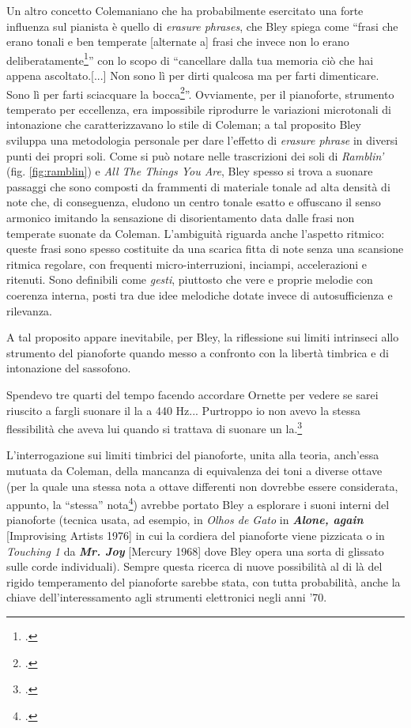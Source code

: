 Un altro concetto Colemaniano che ha probabilmente esercitato una forte influenza sul pianista è quello di \textit{erasure phrases}, che Bley spiega come ``frasi che erano tonali e ben temperate [alternate a] frasi che invece non lo erano deliberatamente\footcite[67]{stopping}'' con lo scopo di ``cancellare dalla tua memoria ciò che hai appena ascoltato.[...] Non sono lì per dirti qualcosa ma per farti dimenticare. Sono lì per farti sciacquare la bocca\footcite[32]{meehan}''. Ovviamente, per il pianoforte, strumento temperato per eccellenza, era impossibile riprodurre le variazioni microtonali di intonazione che caratterizzavano lo stile di Coleman; a tal proposito Bley sviluppa una metodologia personale per dare l'effetto di \textit{erasure phrase} in diversi punti dei propri soli. Come si può notare nelle trascrizioni dei soli di \textit{Ramblin'} (fig. \ref{fig:ramblin}) e \textit{All The Things You Are}, Bley spesso si trova a suonare passaggi che sono composti da frammenti di materiale tonale ad alta densità di note che, di conseguenza, eludono un centro tonale esatto e offuscano il senso armonico imitando la sensazione di disorientamento data dalle frasi non temperate suonate da Coleman. L'ambiguità riguarda anche l'aspetto ritmico: queste frasi sono spesso costituite da una scarica fitta di note senza una scansione ritmica regolare, con frequenti micro-interruzioni, inciampi, accelerazioni e ritenuti. Sono definibili come \textit{gesti}, piuttosto che vere e proprie melodie con coerenza interna, posti tra due idee melodiche dotate invece di autosufficienza e rilevanza.\par 
A tal proposito appare inevitabile, per Bley, la riflessione sui limiti intrinseci allo strumento del pianoforte quando messo a confronto con la libertà timbrica e di intonazione del sassofono.
\begin{fquote}
	Spendevo tre quarti del tempo facendo accordare Ornette per vedere se sarei riuscito a fargli suonare il la a 440 Hz... Purtroppo io non avevo la stessa flessibilità che aveva lui quando si trattava di suonare un la.\footcite[62]{litweiler}
\end{fquote}
L'interrogazione sui limiti timbrici del pianoforte, unita alla teoria, anch'essa mutuata da Coleman, della mancanza di equivalenza dei toni a diverse ottave (per la quale una stessa nota a ottave differenti non dovrebbe essere considerata, appunto, la ``stessa'' nota\footcite[110]{dean}) avrebbe portato Bley a esplorare i suoni interni del pianoforte (tecnica usata, ad esempio, in \textit{Olhos de Gato} in \textit{\textbf{Alone, again}} [Improvising Artists 1976] in cui la cordiera del pianoforte viene pizzicata o in \textit{Touching 1} da \textit{\textbf{Mr. Joy}} [Mercury 1968] dove Bley opera una sorta di glissato sulle corde individuali). Sempre questa ricerca di nuove possibilità al di là del rigido temperamento del pianoforte sarebbe stata, con tutta probabilità, anche la chiave dell'interessamento agli strumenti elettronici negli anni '70.\par

